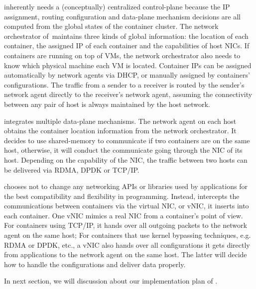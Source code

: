  \sysname inherently needs a (conceptually)
centralized control-plane because the IP assignment, routing configuration and 
data-plane mechanism decisions are all computed from the global states of the
container cluster. The network orchestrator of~\sysname maintains three kinds
of global information: the location of each container, the assigned IP of each
container and the capabilities of host NICs. If containers are running on top of
VMs, the network orchestrator also needs to know which physical machine each VM 
is located. Container IPs can be assigned 
automatically by network agents via DHCP, or manually assigned by containers' 
configurations. The traffic from a sender
to a receiver is routed by the sender's network agent directly to 
the receiver's network agent, assuming the connectivity between
any pair of host is always maintained by the host network. 

 \sysname integrates multiple data-plane 
mechanisms. The network agent on each host 
obtains the container location information from the network orchestrator. 
It decides to use shared-memory to communicate if two containers are on the
same host, otherwise, it will conduct the communicate going through 
the NIC of its host. Depending on the capability of the NIC, the traffic 
between two hosts can be delivered via RDMA, DPDK or TCP/IP.

 \sysname chooses not to change 
any networking APIs or libraries used by applications for the best
compatibility and flexibility in programming. Instead, \sysname intercepts
the communications between containers via the virtual NIC, or vNIC, it 
inserts into each container. One vNIC mimics a real NIC from a container's
point of view. For containers using TCP/IP, it hands over all outgoing packets
to the network agent on the same host; For containers that use kernel bypassing
techniques, e.g. RDMA or DPDK, etc., a vNIC also hands over all configurations
it gets directly from applications to the network agent on the same host. 
The latter will decide how to handle the configurations and deliver data
properly.

In next section, we will discussion about our implementation plan of \sysname.



